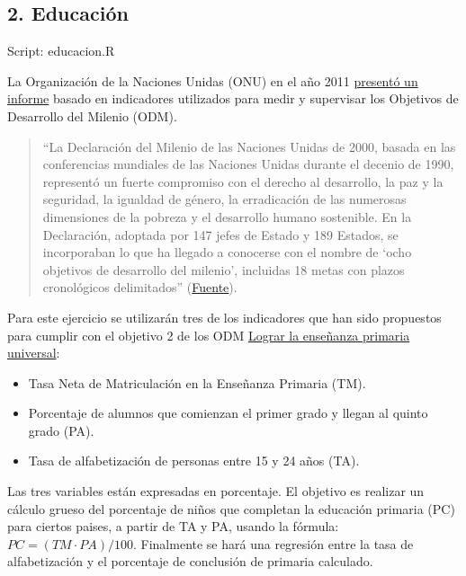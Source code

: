 \documentclass[]{article}
\begin{document}
\subsection{2. Educación}

Script: educacion.R

La Organización de la Naciones Unidas (ONU) en el año 2011
\href{http://mdgs.un.org/unsd/mdg/Resources/Static/Products/Progress2011/11-31342\%20\%28S\%29\%20MDG\%20Report\%202011\_Book\%20LR.pdf}{presentó
un informe} basado en indicadores utilizados para medir y supervisar los
Objetivos de Desarrollo del Milenio (ODM).

\begin{quote}
``La Declaración del Milenio de las Naciones Unidas de 2000, basada en
las conferencias mundiales de las Naciones Unidas durante el decenio de
1990, representó un fuerte compromiso con el derecho al desarrollo, la
paz y la seguridad, la igualdad de género, la erradicación de las
numerosas dimensiones de la pobreza y el desarrollo humano sostenible.
En la Declaración, adoptada por 147 jefes de Estado y 189 Estados, se
incorporaban lo que ha llegado a conocerse con el nombre de `ocho
objetivos de desarrollo del milenio', incluidas 18 metas con plazos
cronológicos delimitados''
(\href{http://unstats.un.org/unsd/publication/seriesf/Seriesf\_95s.pdf}{Fuente}).

\end{quote}
Para este ejercicio se utilizarán tres de los indicadores que han sido
propuestos para cumplir con el objetivo 2 de los ODM
\href{http://www.undp.org/content/undp/es/home/mdgoverview/mdg\_goals/mdg2/}{Lograr
la enseñanza primaria universal}:

\begin{itemize}
\item
  Tasa Neta de Matriculación en la Enseñanza Primaria (TM).
\item
  Porcentaje de alumnos que comienzan el primer grado y llegan al quinto
  grado (PA).
\item
  Tasa de alfabetización de personas entre 15 y 24 años (TA).
\end{itemize}
Las tres variables están expresadas en porcentaje. El objetivo es
realizar un cálculo grueso del porcentaje de niños que completan la
educación primaria (PC) para ciertos paises, a partir de TA y PA, usando
la fórmula: $PC = (TM \cdot PA) / 100$. Finalmente se hará una regresión
entre la tasa de alfabetización y el porcentaje de conclusión de
primaria calculado.
\end{document}
